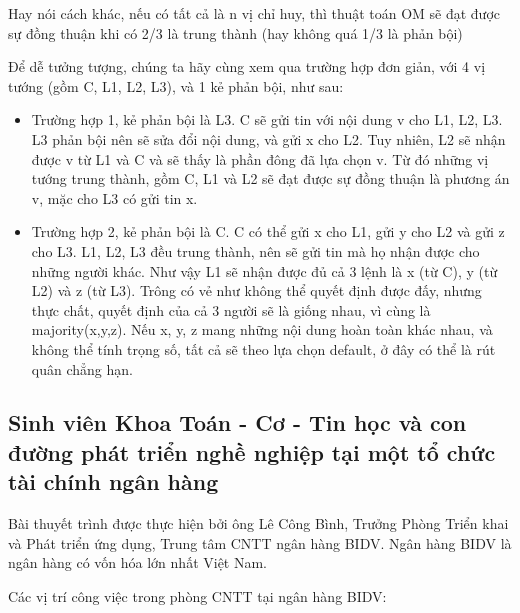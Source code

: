 \documentclass[14pt, a4paper]{article}
\numberwithin{equation}{section}
\numberwithin{figure}{section}
\numberwithin{dl}{section}
\numberwithin{md}{section}
\numberwithin{bd}{section}
\numberwithin{dn}{section}
\numberwithin{hq}{section}
\begin{document}
\begin{enumerate}
        Hay nói cách khác, nếu có tất cả là n vị chỉ huy, thì thuật toán OM sẽ đạt được sự đồng thuận khi có 2/3 là trung thành (hay không quá 1/3 là phản bội)

        Để dễ tưởng tượng, chúng ta hãy cùng xem qua trường hợp đơn giản, với 4 vị tướng (gồm C, L1, L2, L3), và 1 kẻ phản bội, như sau:

        \begin{itemize}
            \item Trường hợp 1, kẻ phản bội là L3. C sẽ gửi tin với nội dung v cho L1, L2, L3. L3 phản bội nên sẽ sửa đổi nội dung, và gửi x cho L2. Tuy nhiên, L2 sẽ nhận được v từ L1 và C và sẽ thấy là phần đông đã lựa chọn v. Từ đó những vị tướng trung thành, gồm C, L1 và L2 sẽ đạt được sự đồng thuận là phương án v, mặc cho L3 có gửi tin x.
            \item Trường hợp 2, kẻ phản bội là C. C có thể gửi x cho L1, gửi y cho L2 và gửi z cho L3. L1, L2, L3 đều trung thành, nên sẽ gửi tin mà họ nhận được cho những người khác. Như vậy L1 sẽ nhận được đủ cả 3 lệnh là x (từ C), y (từ L2) và z (từ L3). Trông có vẻ như không thể quyết định được đấy, nhưng thực chất, quyết định của cả 3 người sẽ là giống nhau, vì cùng là majority(x,y,z). Nếu x, y, z mang những nội dung hoàn toàn khác nhau, và không thể tính trọng số, tất cả sẽ theo lựa chọn default, ở đây có thể là rút quân chẳng hạn.
        \end{itemize}
    \end{enumerate}

    \subsection{Sinh viên Khoa Toán - Cơ - Tin học và con đường phát triển nghề nghiệp tại một tổ chức tài chính ngân hàng}
    
    Bài thuyết trình được thực hiện bởi ông Lê Công Bình, Trưởng Phòng Triển khai và Phát triển ứng dụng, Trung tâm CNTT ngân hàng BIDV.
    Ngân hàng BIDV là ngân hàng có vốn hóa lớn nhất Việt Nam.

    Các vị trí công việc trong phòng CNTT tại ngân hàng BIDV:
\end{document}
